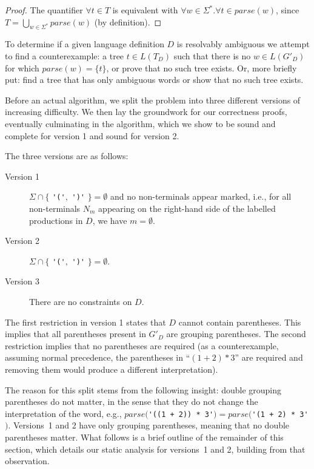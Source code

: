 \documentclass[acmsmall,review,anonymous]{acmart}\settopmatter{printfolios=true,printccs=false,printacmref=false}
\newcommand{\T}{\Sigma} %
\newcommand{\parse}{\mathit{parse}} %
\begin{document}
\begin{proof}
  The quantifier $\forall t \in T$ is equivalent with $\forall w \in \T^{*}. \forall t \in \parse(w)$, since $T = \bigcup_{w \in \T^{*}} \parse(w)$ (by definition).
\end{proof}

\noindent To determine if a given language definition $D$ is resolvably ambiguous we attempt to find a counterexample: a tree $t \in L(T_D)$ such that there is no $w \in L(G'_D)$ for which $\parse(w) = \{t\}$, or prove that no such tree exists. Or, more briefly put: find a tree that has only ambiguous words or show that no such tree exists.

Before an actual algorithm, we split the problem into three different versions of increasing difficulty. We then lay the groundwork for our correctness proofs, eventually culminating in the algorithm, which we show to be sound and complete for version 1 and sound for version 2.

The three versions are as follows:

\begin{description}
\item[Version 1] $\T \cap \{$ \verb|'('|$,$ \verb|')'| $\} = \emptyset$ and no non-terminals appear marked, i.e., for all non-terminals $N_m$ appearing on the right-hand side of the labelled productions in $D$, we have $m = \emptyset$.
\item[Version 2] $\T \cap \{$ \verb|'('|$,$ \verb|')'| $\} = \emptyset$.
\item[Version 3] There are no constraints on $D$.
\end{description}

\noindent The first restriction in version 1 states that $D$ cannot contain parentheses. This implies that all parentheses present in $G'_D$ are grouping parentheses. The second restriction implies that no parentheses are required (as a counterexample, assuming normal precedence, the parentheses in ``$(1 + 2) * 3$'' are required and removing them would produce a different interpretation).

The reason for this split stems from the following insight: double grouping parentheses do not matter, in the sense that they do not change the interpretation of the word, e.g., $\parse($\verb|'((1 + 2)) * 3'|$) = \parse($\verb|'(1 + 2) * 3'|$)$. Versions~1 and 2 have only grouping parentheses, meaning that no double parentheses matter. What follows is a brief outline of the remainder of this section, which details our static analysis for versions~1 and 2, building from that observation.
\end{document}
